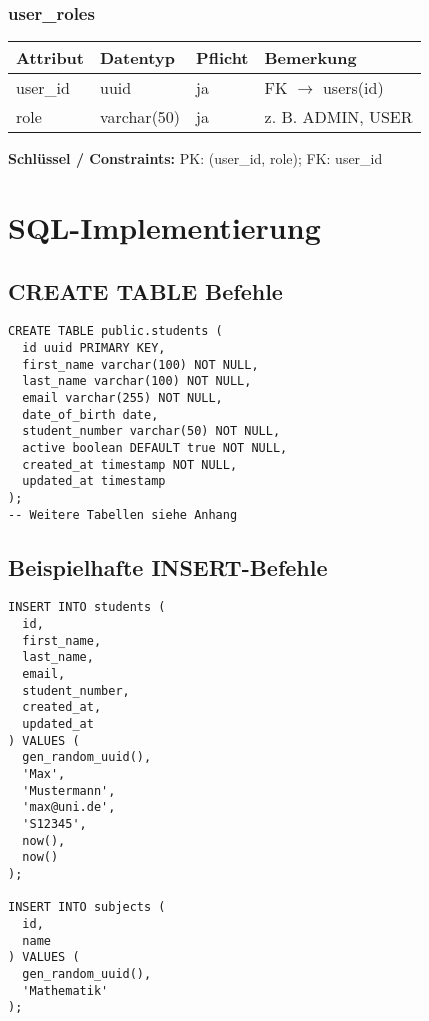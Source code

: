 \documentclass[12pt,a4paper]{article}
\begin{document}
    \subsubsection{user\_roles}
    \begin{longtable}{|L{4cm}|L{3cm}|L{3cm}|L{4cm}|}
        \hline
        \textbf{Attribut} & \textbf{Datentyp} & \textbf{Pflicht} & \textbf{Bemerkung} \\ \hline
        user\_id & uuid & ja & FK $\rightarrow$ users(id) \\ \hline
        role & varchar(50) & ja & z. B. ADMIN, USER \\ \hline
    \end{longtable}
    \textbf{Schlüssel / Constraints:} PK: (user\_id, role); FK: user\_id



    \section{SQL-Implementierung}

    \subsection{CREATE TABLE Befehle}
    \begin{lstlisting}
CREATE TABLE public.students (
  id uuid PRIMARY KEY,
  first_name varchar(100) NOT NULL,
  last_name varchar(100) NOT NULL,
  email varchar(255) NOT NULL,
  date_of_birth date,
  student_number varchar(50) NOT NULL,
  active boolean DEFAULT true NOT NULL,
  created_at timestamp NOT NULL,
  updated_at timestamp
);
-- Weitere Tabellen siehe Anhang
    \end{lstlisting}

    \subsection{Beispielhafte INSERT-Befehle}
    \begin{lstlisting}
INSERT INTO students (
  id,
  first_name,
  last_name,
  email,
  student_number,
  created_at,
  updated_at
) VALUES (
  gen_random_uuid(),
  'Max',
  'Mustermann',
  'max@uni.de',
  'S12345',
  now(),
  now()
);

INSERT INTO subjects (
  id,
  name
) VALUES (
  gen_random_uuid(),
  'Mathematik'
);
    \end{lstlisting}

\end{document}
